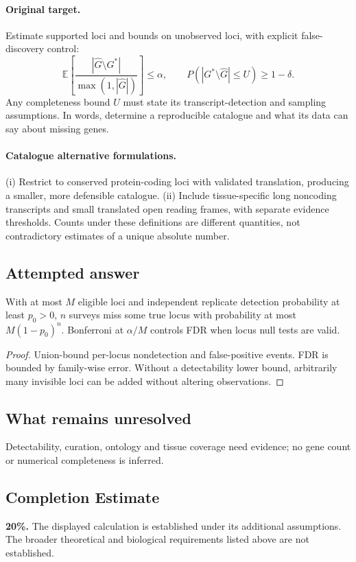 \documentclass[11pt]{article}
\begin{document}
\paragraph{Original target.}
Estimate supported loci and bounds on unobserved loci, with explicit false-discovery control:
\[
\mathbb{E}\!\left[\frac{|\widehat G\setminus G^*|}{\max(1,|\widehat G|)}\right]\leq\alpha,
\qquad P(|G^*\setminus\widehat G|\leq U)\geq1-\delta.
\]
Any completeness bound $U$ must state its transcript-detection and sampling assumptions. In words, determine a reproducible catalogue and what its data can say about missing genes.
\paragraph{Catalogue alternative formulations.}
(i) Restrict to conserved protein-coding loci with validated translation, producing a smaller, more defensible catalogue. (ii) Include tissue-specific long noncoding transcripts and small translated open reading frames, with separate evidence thresholds. Counts under these definitions are different quantities, not contradictory estimates of a unique absolute number.
\subsection{Attempted answer}
\begin{proposition}
With at most $M$ eligible loci and independent replicate detection probability at least $p_0>0$, $n$ surveys miss some true locus with probability at most $M(1-p_0)^n$. Bonferroni at $\alpha/M$ controls FDR when locus null tests are valid.
\end{proposition}
\begin{proof}
Union-bound per-locus nondetection and false-positive events. FDR is bounded by family-wise error. Without a detectability lower bound, arbitrarily many invisible loci can be added without altering observations.
\end{proof}
\subsection{What remains unresolved}
Detectability, curation, ontology and tissue coverage need evidence; no gene count or numerical completeness is inferred.
\subsection{Completion Estimate}
\textbf{20\%.} The displayed calculation is established under its additional assumptions. The broader theoretical and biological requirements listed above are not established.
\end{document}
